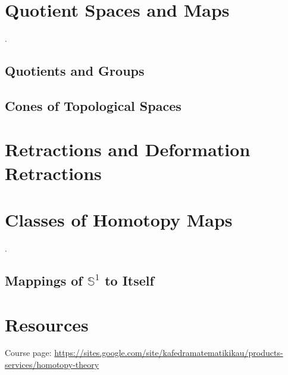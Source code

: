 \documentclass[10pt]{article}
\begin{document}
\section{Quotient Spaces and Maps}


.


\subsection{Quotients and Groups}

\subsection{Cones of Topological Spaces}

\section{Retractions and Deformation Retractions}

\section{Classes of Homotopy Maps}

.

\subsection{Mappings of $\mathbb{S}^1$ to Itself}


\section{Resources}

Course page: \url{https://sites.google.com/site/kafedramatematikikau/products-services/homotopy-theory}

{}

\end{document}
